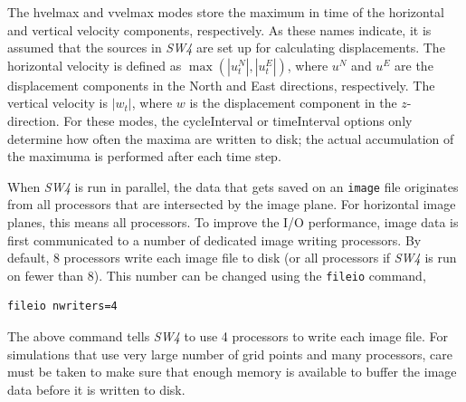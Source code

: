 \documentclass[11pt]{report}
\begin{document}
The hvelmax and vvelmax modes store the maximum in time of the horizontal and vertical velocity
components, respectively. As these names indicate, it is assumed that the sources in \emph{SW4} are
set up for calculating displacements. The horizontal velocity is defined as $\max(|u^N_t|,|u^E_t|)$,
where $u^N$ and $u^E$ are the displacement components in the North and East directions,
respectively. The vertical velocity is $|w_t|$, where $w$ is the displacement component in the
$z$-direction. For these modes, the cycleInterval or timeInterval options only determine how often
the maxima are written to disk; the actual accumulation of the maximuma is performed after each time
step.

When \emph{SW4} is run in parallel, the data that gets saved on an {\tt image} file originates from
all processors that are intersected by the image plane. For horizontal image planes, this means all
processors. To improve the I/O performance, image data is first communicated to a number of
dedicated image writing processors. By default, 8 processors write each image file to disk (or all
processors if \emph{SW4} is run on fewer than 8). This number can be changed using the {\tt fileio}
command,
\begin{verbatim}
fileio nwriters=4
\end{verbatim}
The above command tells \emph{SW4} to use 4 processors to write each image file. For simulations
that use very large number of grid points and many processors, care must be taken to make sure that
enough memory is available to buffer the image data before it is written to disk.
\end{document}
